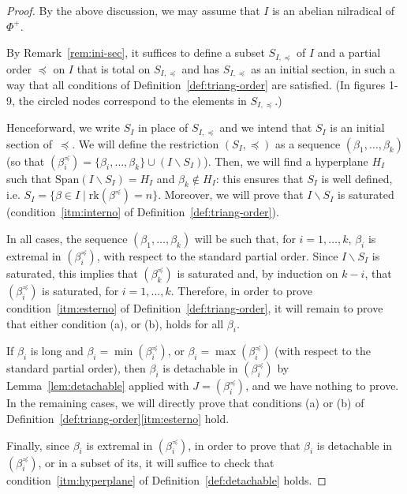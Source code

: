 \documentclass[ALCO,published]{cedram}
\theoremstyle{plain}
\newcommand\smeno{\smallsetminus}
\newcommand\gen{\mathrm{Span}}
\newcommand\rk{\mathrm{rk}}
\newcommand\be{\beta}
\newcommand\preq{\preccurlyeq}
\begin{document}
\begin{proof}
By the above discussion, we may assume that $I$ is an abelian nilradical of~$\Phi^+$. 
\par
By Remark~\ref{rem:ini-sec}, it suffices to define a subset $S_{I,\preq}$  of $I$ and a partial order $\preq$ on $I$ that is total on $S_{I,\preq}$ and has $S_{I,\preq}$ as an initial section, in such a way that all conditions of Definition~\ref{def:triang-order} are satisfied. (In figures 1-9, the circled nodes correspond to the elements in $S_{I,\preq}$.)
\par
Henceforward, we write $S_I$ in place of $S_{I,\preq}$ and we intend that $S_I$ is an initial section of~$\preq$.
We will define the restriction $(S_I, \preq)$ as a sequence $(\be_1, \dots, \be_k)$ (so that $(\be_i^\preq)=\{\be_i, \dots, \be_k\}\cup (I\smeno S_I)$).
Then, we will find a hyperplane $H_I$ such that $\gen(I\smeno S_I)=H_I$ and $\be_k\not\in H_I$: this ensures that  $S_I$ is well defined, i.e. $S_I=\{\be\in I\mid \rk(\be^\preq)=n\}$.
Moreover, we will prove that $I\smeno S_I$ is saturated (condition~\ref{itm:interno} of Definition~\ref{def:triang-order}). 
\par
In all cases, the sequence $(\be_1, \dots, \be_k)$ will be such that,  for $i=1, \dots, k$,  $\be_i$ is extremal in $(\be_i^\preq)$, with respect to the standard partial order. 
Since $I\smeno S_I$ is saturated, this implies that  $(\be_k^\preq)$ is saturated and, by induction on $k-i$, that $(\be_i^\preq)$ is saturated, for $i=1,\dots, k$.
Therefore, in order to prove condition~\ref{itm:esterno} of Definition~\ref{def:triang-order}, it will remain to prove that either condition (a),  or (b), holds for all $\be_i$.

\par
If $\be_i$ is long and  $\be_i=\min(\be_i^\preq)$, or $\be_i=\max(\be_i^\preq)$ (with respect to the standard partial order), then $\be_i$ is detachable in  $(\be_i^\preq)$ by Lemma~\ref{lem:detachable} applied with $J=(\be_i^\preq)$, and we have nothing to prove.
In the remaining cases, we will directly prove that conditions  (a) or (b) of Definition~\ref{def:triang-order}\ref{itm:esterno} hold.
\par

Finally, since $\be_i$ is extremal in $(\be_i^\preq)$, in order to prove that  $\be_i$ is detachable in  $(\be_i^\preq)$, or in a subset of its, it will suffice to check that condition~\ref{itm:hyperplane} of Definition~\ref{def:detachable} holds. 
\par


\end{proof}
\end{document}
